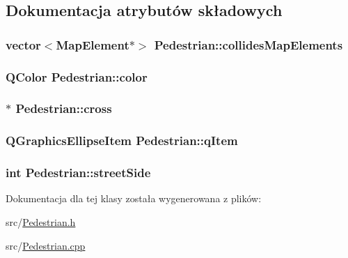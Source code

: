 \subsection{Dokumentacja atrybutów składowych}
\hypertarget{class_pedestrian_a48bacc3e03bc81dde872f5673981a9cb}{
\subsubsection[{collides\-Map\-Elements}]{\setlength{\rightskip}{0pt plus 5cm}vector$<${\bf Map\-Element}$\ast$$>$ Pedestrian\-::collides\-Map\-Elements\hspace{0.3cm}{\ttfamily [private]}}}\label{class_pedestrian_a48bacc3e03bc81dde872f5673981a9cb}
\hypertarget{class_pedestrian_a4afcf22801bb0182dbdb30a9deb17247}{
\subsubsection[{color}]{\setlength{\rightskip}{0pt plus 5cm}Q\-Color Pedestrian\-::color\hspace{0.3cm}{\ttfamily [private]}}}\label{class_pedestrian_a4afcf22801bb0182dbdb30a9deb17247}
\hypertarget{class_pedestrian_aaf596166aee518f9610d0b4ef724ff98}{
\subsubsection[{cross}]{$\ast$ Pedestrian\-::cross\hspace{0.3cm}{\ttfamily [private]}}}\label{class_pedestrian_aaf596166aee518f9610d0b4ef724ff98}
\hypertarget{class_pedestrian_a4f4897cab46bae56b3d4217167241ece}{
\subsubsection[{q\-Item}]{\setlength{\rightskip}{0pt plus 5cm}Q\-Graphics\-Ellipse\-Item Pedestrian\-::q\-Item\hspace{0.3cm}{\ttfamily [private]}}}\label{class_pedestrian_a4f4897cab46bae56b3d4217167241ece}
\hypertarget{class_pedestrian_a8b84bca49170ed2945b300e2cb430c27}{
\subsubsection[{street\-Side}]{\setlength{\rightskip}{0pt plus 5cm}int Pedestrian\-::street\-Side\hspace{0.3cm}{\ttfamily [private]}}}\label{class_pedestrian_a8b84bca49170ed2945b300e2cb430c27}


Dokumentacja dla tej klasy została wygenerowana z plików\-:\begin{DoxyCompactItemize}
\item 
src/\hyperlink{_pedestrian_8h}{Pedestrian.\-h}\item 
src/\hyperlink{_pedestrian_8cpp}{Pedestrian.\-cpp}\end{DoxyCompactItemize}
